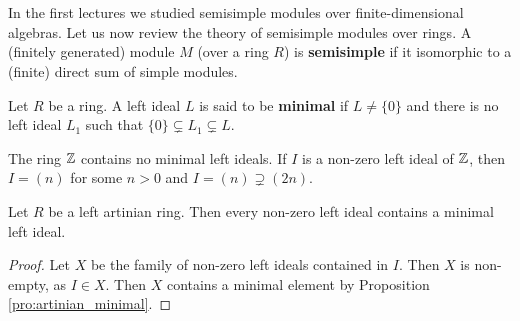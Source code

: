\chapter{}





In the first lectures we studied semisimple modules over finite-dimensional 
algebras. Let us now review the theory of semisimple modules over rings. 
A (finitely generated) module $M$ (over a ring $R$) is \textbf{semisimple} 
if it isomorphic to a (finite) direct sum of simple modules. 

\begin{definition}
    Let $R$ be a ring. A left ideal $L$ is said to be \textbf{minimal}
    if $L\ne\{0\}$ and there is no left ideal $L_1$
    such that $\{0\}\subsetneq L_1\subsetneq L$.
\end{definition}

The ring $\mathbb{Z}$ contains no minimal left ideals. If $I$ is a non-zero 
left ideal of $\mathbb{Z}$, then
$I=(n)$ for some $n>0$ and $I=(n)\supsetneq (2n)$. 

\begin{proposition}
    Let $R$ be a left artinian ring. 
    Then every non-zero left ideal contains a minimal left ideal. 
\end{proposition}

\begin{proof}
    Let $X$ be the family of non-zero left ideals contained in $I$. Then $X$ is non-empty, as 
    $I\in X$. Then $X$ contains a minimal element by Proposition \ref{pro:artinian_minimal}. 
\end{proof}



